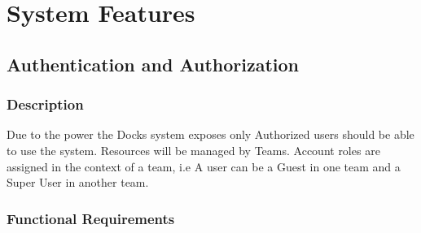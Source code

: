 \documentclass[]{article}
\begin{document}
\section{System Features}
\subsection{Authentication and Authorization}
\subsubsection{Description}
Due to the power the Docks system exposes only Authorized users should be able to use the system.
Resources will be managed by Teams. Account roles are assigned in the context of a team, i.e A
user can be a Guest in one team and a Super User in another team.

\subsubsection{Functional Requirements}
\end{document}
